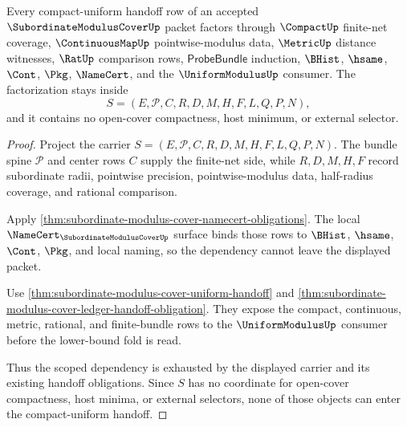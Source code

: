 \begin{theorem}
\label{thm:subordinate-modulus-cover-scope-dependency}
Every compact-uniform handoff row of an accepted $\SubordinateModulusCoverUp$ packet factors through $\CompactUp$ finite-net coverage, $\ContinuousMapUp$ pointwise-modulus data, $\MetricUp$ distance witnesses, $\RatUp$ comparison rows, $\mathsf{ProbeBundle}$ induction, $\BHist$, $\hsame$, $\Cont$, $\Pkg$, $\NameCert$, and the $\UniformModulusUp$ consumer. The factorization stays inside
$$
S=(E,\mathcal{P},C,R,D,M,H,F,L,Q,P,N),
$$
and it contains no open-cover compactness, host minimum, or external selector.
\end{theorem}
\begin{proof}
Project the carrier $S=(E,\mathcal{P},C,R,D,M,H,F,L,Q,P,N)$. The bundle spine $\mathcal{P}$ and center rows $C$ supply the finite-net side, while $R,D,M,H,F$ record subordinate radii, pointwise precision, pointwise-modulus data, half-radius coverage, and rational comparison.

Apply \autoref{thm:subordinate-modulus-cover-namecert-obligations}. The local $\NameCert_{\SubordinateModulusCoverUp}$ surface binds those rows to $\BHist$, $\hsame$, $\Cont$, $\Pkg$, and local naming, so the dependency cannot leave the displayed packet.

Use \autoref{thm:subordinate-modulus-cover-uniform-handoff} and \autoref{thm:subordinate-modulus-cover-ledger-handoff-obligation}. They expose the compact, continuous, metric, rational, and finite-bundle rows to the $\UniformModulusUp$ consumer before the lower-bound fold is read.

Thus the scoped dependency is exhausted by the displayed carrier and its existing handoff obligations. Since $S$ has no coordinate for open-cover compactness, host minima, or external selectors, none of those objects can enter the compact-uniform handoff.
\end{proof}

